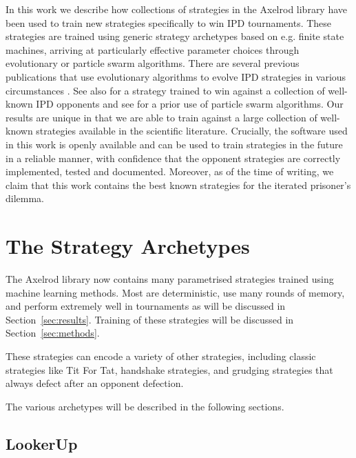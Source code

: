 \documentclass{article}
\begin{document}
In this work we describe how collections of strategies in the Axelrod library
have been used to train new strategies specifically to win IPD tournaments.
These strategies are trained using generic strategy archetypes based on e.g.
finite state
machines, arriving at particularly effective parameter choices through
evolutionary or particle swarm algorithms. There are several
previous publications that use evolutionary algorithms to
evolve IPD strategies in various circumstances
\cite{ashlock2006training, ashlock2015multiple, ashlock2006changes,
      ashlock2014shaped, ashlock2014evolution, barlow2015varying,
      fogel1993evolving, marks1989niche, sudo2015effects,
      vassiliades2010multiagent}. See also \cite{gaudesi2016exploiting} for a
strategy trained to win against a collection of well-known IPD opponents and see
\cite{franken2005particle} for a prior use of particle swarm algorithms. Our
results are unique in that we are able to train against a large collection of
well-known strategies available in the scientific literature. Crucially, the
software used in this work is openly available and can be used to train strategies
in the future in a reliable manner, with confidence that the opponent strategies
are correctly implemented, tested and documented.
Moreover, as of the time of writing,
we claim that this work contains the best known strategies for the iterated
prisoner's dilemma.

\section{The Strategy Archetypes}

The Axelrod library now contains many parametrised strategies trained using
machine learning
methods. Most are deterministic, use many rounds of memory, and perform
extremely well in tournaments as will be discussed in Section~\ref{sec:results}.
Training of these strategies will be discussed in Section~\ref{sec:methods}.

These strategies can encode a variety
of other strategies, including classic strategies like Tit For Tat,
handshake strategies, and grudging strategies that always defect after
an opponent defection.

The various archetypes will be described in the following sections.

\subsection{LookerUp}
\end{document}
